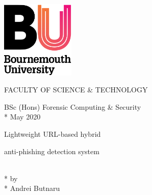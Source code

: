 
\begin{titlepage}
    \centering
{}

\vspace*{1em}\hspace*{-1cm}\includegraphics[width=3.5cm, left]{figures/unilogo.png}

\begin{center}
\huge{FACULTY OF SCIENCE \& TECHNOLOGY}
\\
\normalsize\vspace{6em}

\LARGE{
BSc (Hons) Forensic Computing \& Security
}
\\*
\LARGE{
May 2020
}

\normalsize\vspace{6em}

\LARGE{
Lightweight URL-based hybrid 

anti-phishing detection system
}
\\*
\normalsize\vspace{4em}
\LARGE{by}
\\*
\normalsize\vspace{4em}
\LARGE{
Andrei Butnaru
}

\end{center}
\end{titlepage}
\cleardoublepage



